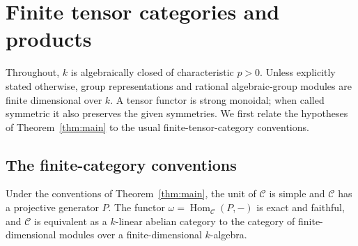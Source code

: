 \section{Finite tensor categories and products}
\label{sec:preliminaries}

Throughout, $k$ is algebraically closed of characteristic $p>0$.
Unless explicitly stated otherwise, group representations and rational
algebraic-group modules are finite dimensional over $k$. A tensor functor is strong monoidal;
when called symmetric it also preserves the given symmetries.
We first relate the hypotheses of Theorem~\ref{thm:main} to the usual
finite-tensor-category conventions.

\subsection{The finite-category conventions}

\begin{lemma}\label{lem:finite-conventions}
Under the conventions of Theorem~\ref{thm:main}, the unit of $\mathcal C$
is simple and $\mathcal C$ has a projective generator $P$.  The functor
$\omega=\operatorname{Hom}_{\mathcal C}(P,-)$ is exact and faithful, and
$\mathcal C$ is equivalent as a $k$-linear abelian category to the category
of finite-dimensional modules over a finite-dimensional $k$-algebra.
\end{lemma}

